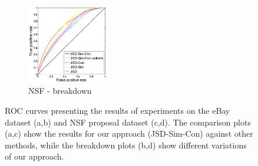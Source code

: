 \documentclass{article} %
\begin{document}
\begin{figure}
        ~ %
        \begin{subfigure}[b]{0.24\textwidth}
        	        \centering
                \includegraphics[width=36mm]{figures/nsf-breakdown-kopia.png}
               \caption{NSF - breakdown}
                \label{fig:nsf-breakdown}
        \end{subfigure}
       \caption{ROC curves presenting the results of experiments on
         the eBay dataset (a,b) and NSF proposal dataset (c,d). The
         comparison plots (a,c) show the results for our approach (JSD-Sim-Con)
         against other methods, while the breakdown plots (b,d)
         show different variations of our approach. }\label{fig:roc-curves}
\end{figure}
\end{document}
